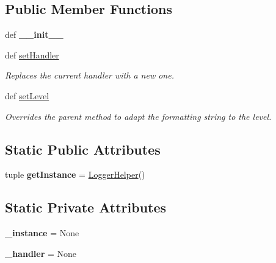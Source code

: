 \subsection*{Public Member Functions}
\begin{DoxyCompactItemize}
\item 
\hypertarget{classmedpy_1_1core_1_1Logger_1_1Logger_a8fdfdb7972f6ca4f3b20e98985988bc7}{
def {\bfseries \_\-\_\-init\_\-\_\-}}
\label{classmedpy_1_1core_1_1Logger_1_1Logger_a8fdfdb7972f6ca4f3b20e98985988bc7}

\item 
def \hyperlink{classmedpy_1_1core_1_1Logger_1_1Logger_a9b4ca5d9e5d84d5da1ebda4929c3d757}{setHandler}
\begin{DoxyCompactList}\small\item\em Replaces the current handler with a new one. \end{DoxyCompactList}\item 
\hypertarget{classmedpy_1_1core_1_1Logger_1_1Logger_a7ef3cbfa57e61d02882e586ff7baa176}{
def \hyperlink{classmedpy_1_1core_1_1Logger_1_1Logger_a7ef3cbfa57e61d02882e586ff7baa176}{setLevel}}
\label{classmedpy_1_1core_1_1Logger_1_1Logger_a7ef3cbfa57e61d02882e586ff7baa176}

\begin{DoxyCompactList}\small\item\em Overrides the parent method to adapt the formatting string to the level. \end{DoxyCompactList}\end{DoxyCompactItemize}
\subsection*{Static Public Attributes}
\begin{DoxyCompactItemize}
\item 
\hypertarget{classmedpy_1_1core_1_1Logger_1_1Logger_ae169695a25c1a25f4929d03eb5ff016b}{
tuple {\bfseries getInstance} = \hyperlink{classmedpy_1_1core_1_1Logger_1_1Logger_1_1LoggerHelper}{LoggerHelper}()}
\label{classmedpy_1_1core_1_1Logger_1_1Logger_ae169695a25c1a25f4929d03eb5ff016b}

\end{DoxyCompactItemize}
\subsection*{Static Private Attributes}
\begin{DoxyCompactItemize}
\item 
\hypertarget{classmedpy_1_1core_1_1Logger_1_1Logger_af48b52980156fd81d4297cf243204a1e}{
{\bfseries \_\-instance} = None}
\label{classmedpy_1_1core_1_1Logger_1_1Logger_af48b52980156fd81d4297cf243204a1e}

\item 
\hypertarget{classmedpy_1_1core_1_1Logger_1_1Logger_a82158993b8453bc1b8881f5e92a413ff}{
{\bfseries \_\-handler} = None}
\label{classmedpy_1_1core_1_1Logger_1_1Logger_a82158993b8453bc1b8881f5e92a413ff}

\end{DoxyCompactItemize}


